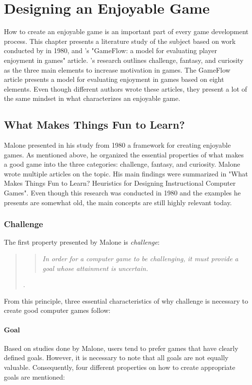 \section{Designing an Enjoyable Game}
\label{chap:design_an_enjoyable_game}

How to create an enjoyable game is an important part of every game development process. This chapter presents a literature study of the subject based on work conducted by \citeauthor{malone_what_1980} in 1980, and \citeauthor{sweetser_gameflow_2005}’s "GameFlow: a model for evaluating player enjoyment in games" article. \citeauthor{malone_what_1980}’s research outlines challenge, fantasy, and curiosity as the three main elements to increase motivation in games. The GameFlow article presents a model for evaluating enjoyment in games based on eight elements. Even though different authors wrote these articles, they present a lot of the same mindset in what characterizes an enjoyable game.

\subsection{What Makes Things Fun to Learn?}
Malone presented in his study from 1980 a framework for creating enjoyable games. As mentioned above, he organized the essential properties of what makes a good game into the three categories: challenge, fantasy, and curiosity. Malone wrote multiple articles on the topic. His main findings were summarized in "What Makes Things Fun to Learn? Heuristics for Designing Instructional Computer Games". Even though this research was conducted in 1980 and the examples he presents are somewhat old, the main concepts are still highly relevant today.

\subsubsection{Challenge}
The first property presented by Malone is \textit{challenge}:

\begin{quote}\blockquote{\textit{In order for a computer game to be challenging, it must provide a goal whose attainment is uncertain.}} \citep{malone_what_1980}.\end{quote}  

From this principle, three essential characteristics of why challenge is necessary to create good computer games follow:

\paragraph*{Goal} 
Based on studies done by Malone, users tend to prefer games that have clearly defined goals. However, it is necessary to note that all goals are not equally valuable. Consequently, four different properties on how to create appropriate goals are mentioned:

